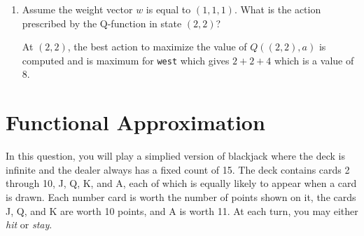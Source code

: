 \documentclass[12pt]{article}
\begin{document}
\begin{enumerate}
\begin{enumerate}
  Using the equation for the $Q$-learning,

  \begin{align*}
    w_{i} &= w_{i} + \alpha\left[R(s,a,s^{\prime}) + \gamma\max_{a^{\prime}}Q(s^{\prime},a^{\prime}) - Q(s,a)\right]f_{i}(s,a)
    \intertext{In calculating this for the first weight, we get}
    w_{1} &= 0 + 0.5\left[ -100 + 0.5(0)\right]f_{1}\left((2,2)\right)\\
         &= 0 + 0.5\left[ -100 + 0.5(0)\right]2 = -100
    \end{align*}

    which when plugging in the values, the first instance for which we get a non-zero reward on the first episode is for $-100$. $w_{1}$ is done as an example below

\begin{align*}
  w_{1} &= 0 + 0.5\left[ -100 + \gamma (0) - 0\right]2 = -100
\end{align*}

  \item Assume the weight vector $w$ is equal to $(1, 1, 1)$.  What is
  the action prescribed by the Q-function in state $(2,2)$?

At $(2,2)$, the best action to maximize the value of $Q((2,2),a)$ is computed and is maximum for {\tt west} which gives $2+2+4$ which is a value of $8$.

  \end{enumerate}

\end{enumerate}

\clearpage

\section{Functional Approximation}

In this question, you will play a simplied version of blackjack where
the deck is infinite and the dealer always has a fixed count of 15.
The deck contains cards 2 through 10, J, Q, K, and A, each of which is
equally likely to appear when a card is drawn.  Each number card is
worth the number of points shown on it, the cards J, Q, and K are
worth 10 points, and A is worth 11.  At each turn, you may either {\it
  hit} or {\it stay}.
\end{document}
